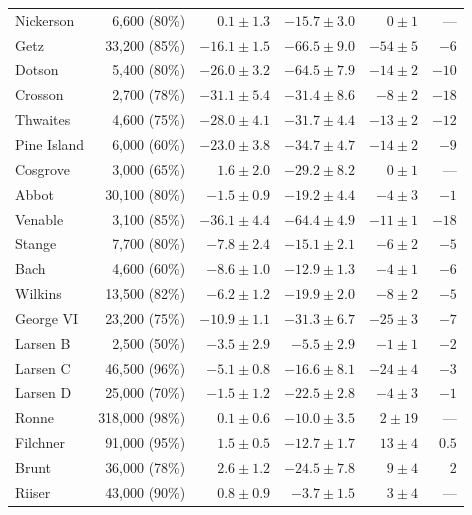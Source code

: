 \begin{footnotesize}
\begin{longtable}{lrrrrr}
Nickerson 	& 6,600     (80\%) & $0.1   \pm 1.3$ & $-15.7 \pm 3.0 $ & $0    \pm 1 $ &  ---   \\
Getz 	        & 33,200    (85\%) & $-16.1 \pm 1.5$ & $-66.5 \pm 9.0 $ & $-54  \pm 5 $ & $-6  $ \\
Dotson  	& 5,400     (80\%) & $-26.0 \pm 3.2$ & $-64.5 \pm 7.9 $ & $-14  \pm 2 $ & $-10 $ \\
Crosson 	& 2,700     (78\%) & $-31.1 \pm 5.4$ & $-31.4 \pm 8.6 $ & $-8   \pm 2 $ & $-18 $ \\
Thwaites 	& 4,600     (75\%) & $-28.0 \pm 4.1$ & $-31.7 \pm 4.4 $ & $-13  \pm 2 $ & $-12 $ \\
Pine Island 	& 6,000     (60\%) & $-23.0 \pm 3.8$ & $-34.7 \pm 4.7 $ & $-14  \pm 2 $ & $-9  $ \\
Cosgrove 	& 3,000     (65\%) & $1.6   \pm 2.0$ & $-29.2 \pm 8.2 $ & $0    \pm 1 $ &  ---   \\
Abbot 	        & 30,100    (80\%) & $-1.5  \pm 0.9$ & $-19.2 \pm 4.4 $ & $-4   \pm 3 $ & $-1  $ \\
Venable 	& 3,100     (85\%) & $-36.1 \pm 4.4$ & $-64.4 \pm 4.9 $ & $-11  \pm 1 $ & $-18 $ \\
Stange 	        & 7,700     (80\%) & $-7.8  \pm 2.4$ & $-15.1 \pm 2.1 $ & $-6   \pm 2 $ & $-5  $ \\
Bach 	        & 4,600     (60\%) & $-8.6  \pm 1.0$ & $-12.9 \pm 1.3 $ & $-4   \pm 1 $ & $-6  $ \\
Wilkins 	& 13,500    (82\%) & $-6.2  \pm 1.2$ & $-19.9 \pm 2.0 $ & $-8   \pm 2 $ & $-5  $ \\
George VI 	& 23,200    (75\%) & $-10.9 \pm 1.1$ & $-31.3 \pm 6.7 $ & $-25  \pm 3 $ & $-7  $ \\
Larsen B 	& 2,500     (50\%) & $-3.5  \pm 2.9$ & $-5.5  \pm 2.9 $ & $-1   \pm 1 $ & $-2  $ \\
Larsen C 	& 46,500    (96\%) & $-5.1  \pm 0.8$ & $-16.6 \pm 8.1 $ & $-24  \pm 4 $ & $-3  $ \\
Larsen D 	& 25,000    (70\%) & $-1.5  \pm 1.2$ & $-22.5 \pm 2.8 $ & $-4   \pm 3 $ & $-1  $ \\
Ronne 	        & 318,000   (98\%) & $0.1   \pm 0.6$ & $-10.0 \pm 3.5 $ & $2    \pm 19$ &  ---   \\
Filchner 	& 91,000    (95\%) & $1.5   \pm 0.5$ & $-12.7 \pm 1.7 $ & $13   \pm 4 $ & $0.5 $ \\
Brunt 	        & 36,000    (78\%) & $2.6   \pm 1.2$ & $-24.5 \pm 7.8 $ & $9    \pm 4 $ & $2   $ \\
Riiser  	& 43,000    (90\%) & $0.8   \pm 0.9$ & $-3.7  \pm 1.5 $ & $3    \pm 4 $ &  ---   \\

\end{longtable}
\end{footnotesize}
